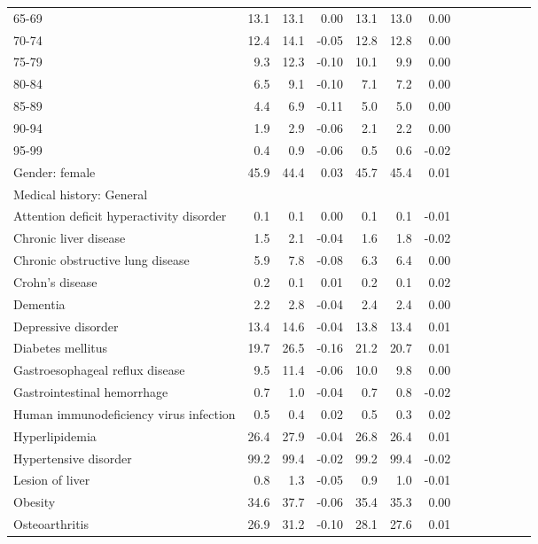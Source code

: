 \documentclass[11pt,]{article}
\begin{document}
\begin{longtable}{lrrrrrrrrrrrr}
      65-69 & 13.1 & 13.1 &  0.00 & 13.1 & 13.0 &  0.00 \\ 
      70-74 & 12.4 & 14.1 & -0.05 & 12.8 & 12.8 &  0.00 \\ 
      75-79 &  9.3 & 12.3 & -0.10 & 10.1 &  9.9 &  0.00 \\ 
      80-84 &  6.5 &  9.1 & -0.10 &  7.1 &  7.2 &  0.00 \\ 
      85-89 &  4.4 &  6.9 & -0.11 &  5.0 &  5.0 &  0.00 \\ 
      90-94 &  1.9 &  2.9 & -0.06 &  2.1 &  2.2 &  0.00 \\ 
      95-99 &  0.4 &  0.9 & -0.06 &  0.5 &  0.6 & -0.02 \\ 
  Gender: female & 45.9 & 44.4 &  0.03 & 45.7 & 45.4 &  0.01 \\ 
  Medical history: General &    &    &     &    &    &     \\ 
      Attention deficit hyperactivity disorder &  0.1 &  0.1 &  0.00 &  0.1 &  0.1 & -0.01 \\ 
      Chronic liver disease &  1.5 &  2.1 & -0.04 &  1.6 &  1.8 & -0.02 \\ 
      Chronic obstructive lung disease &  5.9 &  7.8 & -0.08 &  6.3 &  6.4 &  0.00 \\ 
      Crohn's disease &  0.2 &  0.1 &  0.01 &  0.2 &  0.1 &  0.02 \\ 
      Dementia &  2.2 &  2.8 & -0.04 &  2.4 &  2.4 &  0.00 \\ 
      Depressive disorder & 13.4 & 14.6 & -0.04 & 13.8 & 13.4 &  0.01 \\ 
      Diabetes mellitus & 19.7 & 26.5 & -0.16 & 21.2 & 20.7 &  0.01 \\ 
      Gastroesophageal reflux disease &  9.5 & 11.4 & -0.06 & 10.0 &  9.8 &  0.00 \\ 
      Gastrointestinal hemorrhage &  0.7 &  1.0 & -0.04 &  0.7 &  0.8 & -0.02 \\ 
      Human immunodeficiency virus infection &  0.5 &  0.4 &  0.02 &  0.5 &  0.3 &  0.02 \\ 
      Hyperlipidemia & 26.4 & 27.9 & -0.04 & 26.8 & 26.4 &  0.01 \\ 
      Hypertensive disorder & 99.2 & 99.4 & -0.02 & 99.2 & 99.4 & -0.02 \\ 
      Lesion of liver &  0.8 &  1.3 & -0.05 &  0.9 &  1.0 & -0.01 \\ 
      Obesity & 34.6 & 37.7 & -0.06 & 35.4 & 35.3 &  0.00 \\ 
      Osteoarthritis & 26.9 & 31.2 & -0.10 & 28.1 & 27.6 &  0.01 \\ 

\end{longtable}
\end{document}
